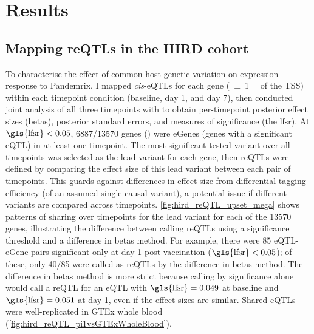 \section{Results}

\subsection{Mapping reQTLs in the HIRD cohort}

To characterise the effect of common host genetic variation on expression response to Pandemrix,
I mapped \textit{cis}-\glspl{eQTL} for each gene (\SI{\pm1}{\mega\bp} of the \gls{TSS}) within each timepoint condition (baseline, day 1, and day 7),
then conducted joint analysis of all three timepoints with  \autocite{urbut2018FlexibleStatisticalMethods} to obtain per-timepoint posterior effect sizes (betas), posterior standard errors, and measures of significance (the \gls{lfsr}).
At $\text{\gls{lfsr}} < 0.05$, \num{6887/13570} genes () were eGenes (genes with a significant \gls{eQTL}) in at least one timepoint.
The most significant tested variant over all timepoints was selected as the lead variant for each gene,
then \glspl{reQTL} were defined by comparing the effect size of this lead variant between each pair of timepoints.
This guards against differences in effect size from differential tagging efficiency (of an assumed single causal variant), 
a potential issue if different variants are compared across timepoints.
\cref{fig:hird_reQTL_upset_mega} shows patterns of sharing over timepoints for the lead variant for each of the \num{13570} genes,
illustrating the difference between calling \glspl{reQTL} using a significance threshold and a difference in betas method.
For example, there were 85 \gls{eQTL}-eGene pairs significant only at day 1 post-vaccination ($\text{\gls{lfsr}} < 0.05$); of these, only \num{40/85} were called as \glspl{reQTL} by the difference in betas method.
The difference in betas method is more strict because calling by significance alone would call a \gls{reQTL} for an \gls{eQTL} with $\text{\gls{lfsr}} = 0.049$ at baseline and $\text{\gls{lfsr}}= 0.051$ at day 1, even if the effect sizes are similar.
Shared \glspl{eQTL} were well-replicated in GTEx whole blood (\cref{fig:hird_reQTL_pi1vsGTExWholeBlood}).

